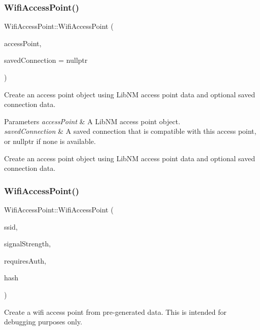 \subsubsection{\texorpdfstring{Wifi\+Access\+Point()}{WifiAccessPoint()}\hspace{0.1cm}{\footnotesize\ttfamily [1/2]}}
{\footnotesize\ttfamily Wifi\+Access\+Point\+::\+Wifi\+Access\+Point (\begin{DoxyParamCaption}\item[{N\+M\+Access\+Point $\ast$}]{access\+Point,  }\item[{N\+M\+Connection $\ast$}]{saved\+Connection = {\ttfamily nullptr} }\end{DoxyParamCaption})}

Create an access point object using Lib\+NM access point data and optional saved connection data.


\begin{DoxyParams}{Parameters}
{\em access\+Point} & A Lib\+NM access point object.\\
\hline
{\em saved\+Connection} & A saved connection that is compatible with this access point, or nullptr if none is available.\\
\hline
\end{DoxyParams}
Create an access point object using Lib\+NM access point data and optional saved connection data. \mbox{\label{classWifiAccessPoint_a588334ccd7e0ff60c32229b13df37c17}} 
\subsubsection{\texorpdfstring{Wifi\+Access\+Point()}{WifiAccessPoint()}\hspace{0.1cm}{\footnotesize\ttfamily [2/2]}}
{\footnotesize\ttfamily Wifi\+Access\+Point\+::\+Wifi\+Access\+Point (\begin{DoxyParamCaption}\item[{String}]{ssid,  }\item[{int}]{signal\+Strength,  }\item[{bool}]{requires\+Auth,  }\item[{String}]{hash }\end{DoxyParamCaption})}

Create a wifi access point from pre-\/generated data. This is intended for debugging purposes only.


